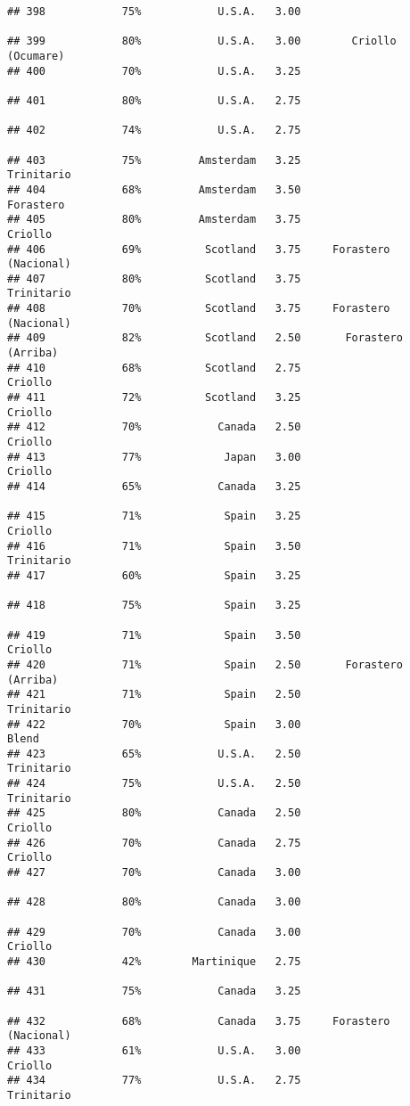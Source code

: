 \documentclass[
]{article}
\begin{document}
\begin{verbatim}
## 398            75%            U.S.A.   3.00                         
## 399            80%            U.S.A.   3.00        Criollo (Ocumare)
## 400            70%            U.S.A.   3.25                         
## 401            80%            U.S.A.   2.75                         
## 402            74%            U.S.A.   2.75                         
## 403            75%         Amsterdam   3.25               Trinitario
## 404            68%         Amsterdam   3.50                Forastero
## 405            80%         Amsterdam   3.75                  Criollo
## 406            69%          Scotland   3.75     Forastero (Nacional)
## 407            80%          Scotland   3.75               Trinitario
## 408            70%          Scotland   3.75     Forastero (Nacional)
## 409            82%          Scotland   2.50       Forastero (Arriba)
## 410            68%          Scotland   2.75                  Criollo
## 411            72%          Scotland   3.25                  Criollo
## 412            70%            Canada   2.50                  Criollo
## 413            77%             Japan   3.00                  Criollo
## 414            65%            Canada   3.25                         
## 415            71%             Spain   3.25                  Criollo
## 416            71%             Spain   3.50               Trinitario
## 417            60%             Spain   3.25                         
## 418            75%             Spain   3.25                         
## 419            71%             Spain   3.50                  Criollo
## 420            71%             Spain   2.50       Forastero (Arriba)
## 421            71%             Spain   2.50               Trinitario
## 422            70%             Spain   3.00                    Blend
## 423            65%            U.S.A.   2.50               Trinitario
## 424            75%            U.S.A.   2.50               Trinitario
## 425            80%            Canada   2.50                  Criollo
## 426            70%            Canada   2.75                  Criollo
## 427            70%            Canada   3.00                         
## 428            80%            Canada   3.00                         
## 429            70%            Canada   3.00                  Criollo
## 430            42%        Martinique   2.75                         
## 431            75%            Canada   3.25                         
## 432            68%            Canada   3.75     Forastero (Nacional)
## 433            61%            U.S.A.   3.00                  Criollo
## 434            77%            U.S.A.   2.75               Trinitario

\end{verbatim}
\end{document}
